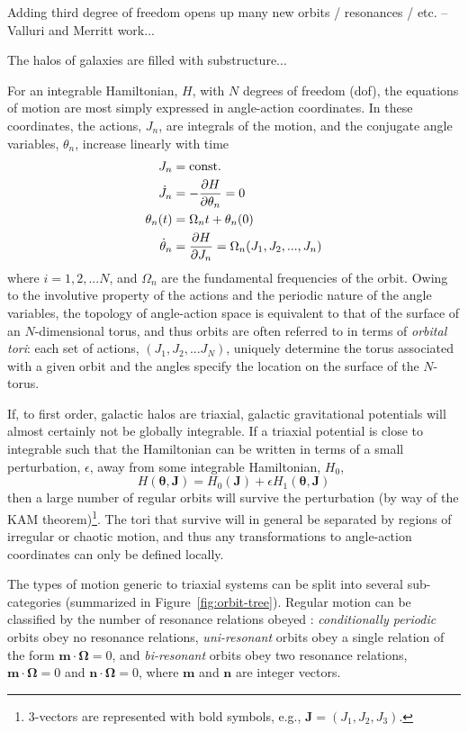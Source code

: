 \documentclass[letterpaper,12pt,preprint]{aastex}
\newcommand{\bs}[1]{\boldsymbol{#1}}
\newcommand{\act}{J}
\begin{document}
Adding third degree of freedom opens up many new orbits / resonances / etc. -- Valluri and Merritt work...

The halos of galaxies are filled with substructure...

For an integrable Hamiltonian, $H$, with $N$ degrees of freedom (dof), the equations of motion are most simply expressed in angle-action coordinates. In these coordinates, the actions, $J_n$, are integrals of the motion, and the conjugate angle variables, $\theta_n$, increase linearly with time
\begin{align}
	\act_n &= {\rm const.}\\
	\dot{\act}_n &= -\frac{\partial H}{\partial \theta_n} = 0\\
	\theta_n(t) &= \Omega_n t + \theta_n(0)\\
	\dot{\theta}_n &= \frac{\partial H}{\partial \act_n} = \Omega_n(\act_1,\act_2,...,\act_n)\label{eq:aafreq}
\end{align}
where $i=1,2,...N$, and $\Omega_n$ are the fundamental frequencies of the orbit. Owing to the involutive property of the actions and the periodic nature of the angle variables, the topology of angle-action space is equivalent to that of the surface of an $N$-dimensional torus, and thus orbits are often referred to in terms of \emph{orbital tori}: each set of actions, $(\act_1,\act_2,...\act_N)$, uniquely determine the torus associated with a given orbit and the angles specify the location on the surface of the $N$-torus.

If, to first order, galactic halos are triaxial, galactic gravitational potentials will almost certainly not be globally integrable. If a triaxial potential is close to integrable such that the Hamiltonian can be written in terms of a small perturbation, $\epsilon$, away from some integrable Hamiltonian, $H_0$,
\begin{equation}
	H(\bs{\theta}, \bs{\act}) = H_0(\bs{\act}) + \epsilon H_1(\bs{\theta}, \bs{\act})
\end{equation}
then a large number of regular orbits will survive the perturbation (by way of the KAM theorem)\footnote{3-vectors are represented with bold symbols, e.g., $\bs{J}=(J_1,J_2,J_3)$.}. The tori that survive will in general be separated by regions of irregular or chaotic motion, and thus any transformations to angle-action coordinates can only be defined locally. 

The types of motion generic to triaxial systems can be split into several sub-categories (summarized in Figure~\ref{fig:orbit-tree}). Regular motion can be classified by the number of resonance relations obeyed \citep[e.g.,][]{lichtenberg83, valluri98}: \emph{conditionally periodic} orbits obey no resonance relations, \emph{uni-resonant} orbits obey a single relation of the form $\bs{m}\cdot\bs{\Omega}=0$, and \emph{bi-resonant} orbits obey two resonance relations, $\bs{m}\cdot\bs{\Omega}=0$ and $\bs{n}\cdot\bs{\Omega}=0$, where $\bs{m}$ and $\bs{n}$ are integer vectors.
\end{document}
